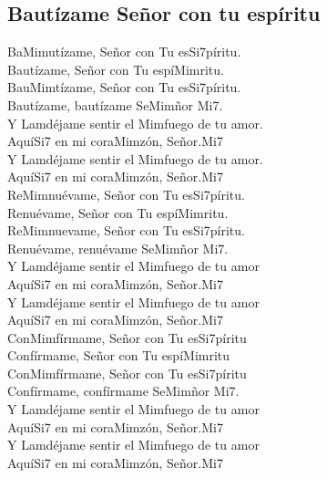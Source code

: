 \subsection{Bautízame Señor con tu espíritu}

\begin{center}

{\Large 
Ba\ac{Mim}utízame, Señor con Tu es\ac{Si7}píritu.\\
Bautízame, Señor con Tu espí\ac{Mim}ritu.\\
Bau\ac{Mim}tízame, Señor con Tu es\ac{Si7}píritu.\\
Bautízame, bautízame Se\ac{Mim}ñor\ac{     Mi7}.\\
\vspace{1ex}
Y \ac{Lam}déjame sentir el \ac{Mim}fuego de tu amor.\\
Aquí\ac{Si7} en mi cora\ac{Mim}zón, Señor.\ac{Mi7}\\
Y \ac{Lam}déjame sentir el \ac{Mim}fuego de tu amor.\\
Aquí\ac{Si7} en mi cora\ac{Mim}zón, Señor.\ac{Mi7}\\
\vspace{1em}
Re\ac{Mim}nuévame, Señor con Tu es\ac{Si7}píritu.\\
Renuévame, Señor con Tu espí\ac{Mim}ritu.\\
Re\ac{Mim}nuevame, Señor con Tu es\ac{Si7}píritu.\\
Renuévame, renuévame Se\ac{Mim}ñor\ac{     Mi7}.\\
\vspace{1ex}
Y \ac{Lam}déjame sentir el \ac{Mim}fuego de tu amor\\
Aquí\ac{Si7} en mi cora\ac{Mim}zón, Señor.\ac{Mi7}\\
Y \ac{Lam}déjame sentir el \ac{Mim}fuego de tu amor\\
Aquí\ac{Si7} en mi cora\ac{Mim}zón, Señor.\ac{Mi7}\\
\vspace{1em}
Con\ac{Mim}fírmame, Señor con Tu es\ac{Si7}píritu\\
Confírmame, Señor con Tu espí\ac{Mim}ritu\\
Con\ac{Mim}fírmame, Señor con Tu es\ac{Si7}píritu\\
Confírmame, confírmame Se\ac{Mim}ñor\ac{     Mi7}.\\
\vspace{1em}
Y \ac{Lam}déjame sentir el \ac{Mim}fuego de tu amor\\
Aquí\ac{Si7} en mi cora\ac{Mim}zón, Señor.\ac{Mi7}\\
Y \ac{Lam}déjame sentir el \ac{Mim}fuego de tu amor\\
Aquí\ac{Si7} en mi cora\ac{Mim}zón, Señor.\ac{Mi7}\\
}
\end{center}